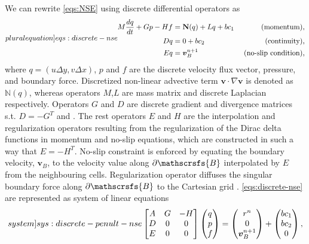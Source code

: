 \documentclass{article}
\numberwithin{equation}{section}
\begin{document}
We can rewrite \cref{eqs:NSE} using discrete differential operators as 
\begin{equation}\label[pluralequation]{eqs:discrete-nse}
\begin{aligned}
	M\frac{dq}{dt} + Gp - Hf &= \mathbf{N}(q) + Lq + bc_1&\text{ (momentum),}\\
	Dq &= 0 + bc_2&\text{ (continuity),}\\
	Eq & = \boldsymbol{v}_B^{n+1} &\text{ (no-slip condition),}
	\end{aligned}
\end{equation}
where $q=(  u\Delta y,v\Delta x )$, $p$ and $f$ are the discrete velocity flux vector, pressure, and boundary force. Discretized non-linear advective term $\boldsymbol{v}\cdot\nabla \boldsymbol{v}$ is denoted as $\mathbb{N}(q)$, whereas operators $M$,$L$ are mass matrix and discrete Laplacian respectively. Operators $G$ and $D$ are discrete gradient and divergence matrices s.t. $D=-G^T$ and \cite{Chang:2002,Perot:1993}. The rest operators $E$ and $H$ are the interpolation and regularization operators resulting from the regularization of the Dirac delta functions in momentum and no-slip equations, which are constructed in such a way that $E=-H^T$. No-slip constraint is enforced by equating the boundary velocity, $\boldsymbol{v}_B$, to the velocity value along $\partial \mathscrsfs{B}$ interpolated by $E$ from the neighbouring cells. Regularization operator diffuses the singular boundary force along $\partial \mathscrsfs{B}$ to the Cartesian grid \cite{Colonius:2008}.  \cref{eqs:discrete-nse} are represented as system of linear equations
\begin{equation}\label[system]{sys:discrete-penult-nse}
	\begin{bmatrix}{}
  A & G & -H \\
  D& 0& 0\\
  E & 0 & 0
\end{bmatrix}
\begin{pmatrix}{}
	q \\
	p \\
  	f
\end{pmatrix}=
\begin{pmatrix}{}
	r^{n} \\
	0 \\
  	\boldsymbol{v}_B^{n+1}
\end{pmatrix}
+\begin{pmatrix}{}
	bc_1 \\
	bc_2 \\
  	0
\end{pmatrix},
\end{equation}
\end{document}
